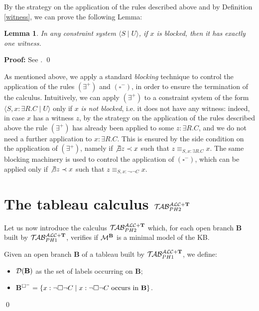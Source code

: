 \documentclass[a4paper, 11pt, oneside]{duthesis}
\newcommand{\tip}{{\bf T}}
\newcommand{\hide}[1]{}
\newcommand{\nott} {\lnot}
\newcommand{\tc} {\mid}
\newcommand{\bbox}{\square}
\newcommand{\sx} {\langle}
\newcommand{\dx} {\rangle}
\newcommand{\esiste} {\exists}
\newcommand{\db}{\mathcal{D}(\mbox{\bf B})}
\newcommand{\emme} {\begin{mathcal}M\end{mathcal}}
\newcommand{\primo}{\mathrel{{\mathcal{T}\!\mathcal{AB}}}_{PH 1}^{\mathcal{ALC}+\mbox{\scriptsize $\tip$}}}
\newcommand{\secondo}{\mathrel{{\mathcal{T}\!\mathcal{AB}}}_{PH 2}^{\mathcal{ALC}+\mbox{\scriptsize $\tip$}}}
\newenvironment{proof}
{\begin{trivlist} \item[] {\bf Proof:}}%
{\qed \end{trivlist}}
\newenvironment{definition}
{\begin{defi} \rm}{\qed \end{defi}}
\newenvironment{proof}
{\begin{trivlist} \item[] {\bf Proof:}}%
{\qed \end{trivlist}}
\newenvironment{definition}
{\begin{defi} \rm}{\qed \end{defi}}
\newtheorem{definition}{Definition}
\newtheorem{lemma}{Lemma}
\newcounter{posu}
\newtheorem{lemma}[posu]{Lemma}
\newtheorem{definition}[posu]{Definition}
\newtheorem{proof}[posu]{Proof}
\begin{document}
\noindent By the strategy on the application of the rules described above and by Definition \ref{witness}, we can prove the following Lemma:

\begin{lemma}\label{esistenza witness}
  In any constraint system $\sx S \tc U \dx$, if $x$ is blocked, then it has exactly one witness.
\end{lemma}

\begin{proof}
See \cite{Giordano:2013:NDL:2435476.2435957}.
\end{proof}

\noindent As mentioned above, we apply a standard \emph{blocking} technique to control the application of the rules $(\esiste^+)$ and $(\bbox^-)$, in order to ensure the termination of the calculus. Intuitively, we can apply $(\esiste^+)$ to a constraint system of the form $\sx S, x: \esiste R.C \tc U \dx$ only if $x$ \emph{is not blocked}, i.e. it does not have any witness: indeed, in case $x$ has  a witness $z$, by the strategy on the application of the rules described above the rule $(\esiste^+)$ has  already been applied to some $z: \esiste R.C$, and we do not need a further application to $x: \esiste R.C$. This is ensured by the side condition on the application of $(\esiste^+)$, namely if $\not\exists z \prec x$ such that $z \equiv_{S, x: \esiste R.C} x$. The same blocking machinery is used to control the application of $(\bbox^-)$, which can be applied only if $\not\exists z \prec x$ such that $z \equiv_{S, x: \nott \bbox \nott C} x$.



\section{The tableau calculus $\secondo$}\label{tableau_ph2}

Let us now introduce the calculus $\secondo$ which, for each open branch {\bf B} built by $\primo$,  verifies if $\emme^{\bf B}$ is a minimal model of the KB.  \hide{We define: need some definitions:}

\begin{definition}\label{db e prefb}

  Given an open branch {\bf B} of a tableau built by $\primo$, we define:
  \begin{itemize}
  \item $\db$ as the set of labels occurring on {\bf B};
    \item {\bf B}$^{\bbox^{-}}=\{x: \nott \bbox \nott C \tc x: \nott \bbox \nott C \ \mbox{occurs in {\bf B}}\}$.
  \end{itemize}
\end{definition}
\end{document}
